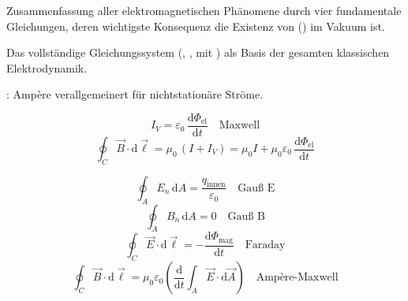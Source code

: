 

\begin{runintext}
Zusammenfassung aller elektromagnetischen Phänomene durch vier fundamentale Gleichungen, deren wichtigste Konsequenz die Existenz von  () im Vakuum ist.
\end{runintext}

\begin{runintext}
Das vollständige Gleichungssystem (, ,  mit ) als Basis der gesamten klassischen Elektrodynamik.
\end{runintext}
\begin{runintext}
: Ampère verallgemeinert für nichtstationäre Ströme.
\end{runintext}
\begin{formulabox}
\[ I_V = \varepsilon_0\,\frac{\mathrm{d}\Phi_{\mathrm{el}}}{\mathrm{d}t} \quad \text{Maxwell} \]
\formulasep
\[ \oint_C \vec{B}\cdot\mathrm{d}\vec{\ell} = \mu_0\,(I + I_V) = \mu_0 I + \mu_0\varepsilon_0\,\frac{\mathrm{d}\Phi_{\mathrm{el}}}{\mathrm{d}t} \]
\end{formulabox}
\begin{formulabox}
\[ \oint_A E_n\,\mathrm{d}A = \frac{q_{\mathrm{innen}}}{\varepsilon_0} \quad \text{Gauß E} \]
\formulasep
\[ \oint_A B_n\,\mathrm{d}A = 0 \quad \text{Gauß B} \]
\formulasep
\[ \oint_C \vec{E}\cdot\mathrm{d}\vec{\ell} = -\frac{\mathrm{d}\Phi_{\mathrm{mag}}}{\mathrm{d}t} \quad \text{Faraday} \]
\formulasep
\[ \oint_C \vec{B}\cdot\mathrm{d}\vec{\ell} = \mu_0\varepsilon_0\left(\frac{\mathrm{d}}{\mathrm{d}t}\int_A \vec{E}\cdot\mathrm{d}\vec{A}\right) \quad \text{Ampère-Maxwell} \]
\end{formulabox}

